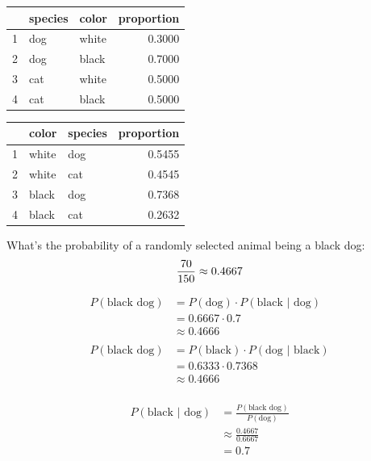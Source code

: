 \documentclass[letterpaper, landscape]{exam}
\begin{document}
  \begin{table}[ht]
    \begin{tabular}{rllr}
      \toprule
         & species & color & proportion \\
      \midrule
      1  & dog     & white & 0.3000 \\
      2  & dog     & black & 0.7000 \\
      \midrule
      3  & cat     & white & 0.5000 \\
      4  & cat     & black & 0.5000 \\
      \bottomrule
    \end{tabular}
  \end{table}

  \begin{table}[ht]
    \begin{tabular}{rllr}
      \toprule
         & color & species & proportion \\
      \midrule
      1  & white & dog     & 0.5455 \\
      2  & white & cat     & 0.4545 \\
      \midrule
      3  & black & dog     & 0.7368 \\
      4  & black & cat     & 0.2632 \\
      \bottomrule
    \end{tabular}
  \end{table}

  What's the probability of a randomly selected animal being a black dog:
  \[
    \frac{70}{150} \approx 0.4667 \\
  \]

  \begin{align*}
    P(\text{black dog}) & = P(\text{dog}) \cdot P(\text{black } | \text{ dog}) \\
                        & = 0.6667 \cdot 0.7 \\
                        & \approx 0.4666 \\
                        \\
    P(\text{black dog}) & = P(\text{black}) \cdot P(\text{dog } | \text{ black}) \\
                        & = 0.6333 \cdot 0.7368 \\
                        & \approx 0.4666 \\
  \end{align*}

  \begin{align*}
    P(\text{black } | \text{ dog}) & = \frac{P(\text{black dog})}{P(\text{dog})} \\
                                   & \approx \frac{0.4667}{0.6667} \\
                                   & = 0.7 \\
  \end{align*}
\end{document}
